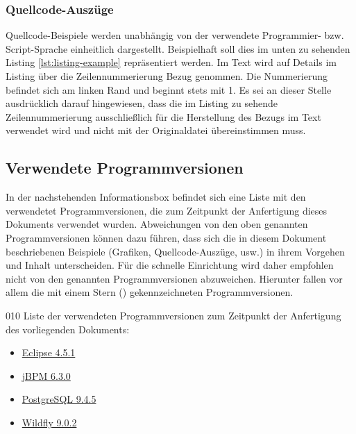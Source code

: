 \subsubsection{Quellcode-Auszüge}
Quellcode-Beispiele werden unabhängig von der verwendete Programmier- bzw. Script-Sprache einheitlich dargestellt. Beispielhaft soll dies im unten zu sehenden Listing \ref{lst:listing-example} repräsentiert werden. 
Im Text wird auf Details im Listing über die Zeilennummerierung Bezug genommen. Die Nummerierung befindet sich am linken Rand und beginnt stets mit 1. Es sei an dieser Stelle ausdrücklich darauf hingewiesen, dass die im Listing zu sehende Zeilennummerierung ausschließlich für die Herstellung des Bezugs im Text verwendet wird und nicht mit der Originaldatei übereinstimmen muss.
\subsection{Verwendete Programmversionen}
In der nachstehenden Informationsbox befindet sich eine Liste mit den verwendetet Programmversionen, die zum Zeitpunkt der Anfertigung dieses Dokuments verwendet wurden. Abweichungen von den oben genannten Programmversionen können dazu führen, dass sich die in diesem Dokument beschriebenen Beispiele (Grafiken, Quellcode-Auszüge, usw.) in ihrem Vorgehen und Inhalt unterscheiden. Für die schnelle Einrichtung wird daher empfohlen nicht von den genannten Programmversionen abzuweichen. Hierunter fallen vor allem die mit einem Stern (\star) gekennzeichneten Programmversionen.
\begin{info}{010}
	Liste der verwendeten Programmversionen zum Zeitpunkt der Anfertigung des vorliegenden Dokuments:
	\begin{itemize}
		\item \href{http://www.eclipse.org/downloads/download.php?file=/technology/epp/downloads/release/mars/1/eclipse-jee-mars-1-win32-x86_64.zip}{Eclipse 4.5.1}%
		\item \href{http://sourceforge.net/projects/jbpm/files/jBPM\%206/jbpm-6.3.0.Final/}{jBPM 6.3.0}\star%
		\item \href{http://get.enterprisedb.com/postgresql/postgresql-9.4.5-1-windows-x64.exe}{PostgreSQL 9.4.5}%
		\item \href{http://download.jboss.org/wildfly/9.0.2.Final/wildfly-9.0.2.Final.zip}{Wildfly 9.0.2}\star%
	\end{itemize}
\end{info}